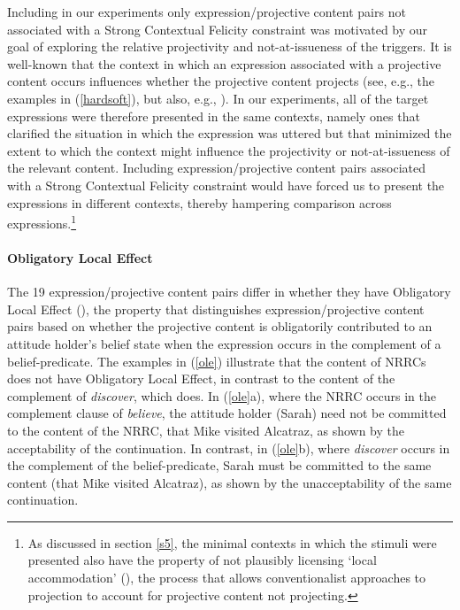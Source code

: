 \documentclass[11pt,fleqn]{article}
\newcommand{\6}{\mbox{$[\hspace*{-.6mm}[$}}
\newcommand{\9}{\mbox{$]\hspace*{-.6mm}]$}}
\begin{document}
Including in our experiments only expression/projective content pairs not associated with a Strong Contextual Felicity constraint was motivated by our goal of exploring the relative projectivity and not-at-issueness of the triggers. It is well-known that the context in which an expression associated with a projective content occurs influences whether the projective content projects (see, e.g., the examples in (\ref{hardsoft}), but also, e.g., \citealt{simons01,beaver-belly}). In our experiments, all of the target expressions were therefore presented in the same contexts, namely ones that clarified the situation in which the expression was uttered but that minimized the extent to which the context might influence the projectivity or not-at-issueness of the relevant content. Including expression/projective content pairs associated with a Strong Contextual Felicity constraint would have forced us to present the expressions in different contexts, thereby hampering comparison across expressions.\footnote{As discussed in section \ref{s5}, the minimal contexts in which the stimuli were presented also have the property of not plausibly licensing `local accommodation' (\citealt{heim83,vds92}), the process that allows conventionalist approaches to projection to account for projective content not projecting.} 

\paragraph{Obligatory Local Effect} The 19 expression/projective content pairs differ in whether they have Obligatory Local Effect (\citealt{brst-lang11}), the property that distinguishes expression/projective content pairs based on whether the projective content is obligatorily contributed to an attitude holder's belief state when the expression occurs in the complement of a belief-predicate. The examples in (\ref{ole}) illustrate that the content of NRRCs does not have Obligatory Local Effect, in contrast to the content of the complement of {\em discover}, which does. In (\ref{ole}a), where the NRRC occurs in the complement clause of {\em believe}, the attitude holder (Sarah) need not be committed to the content of the NRRC, that Mike visited Alcatraz, as shown by the acceptability of the continuation. In contrast, in (\ref{ole}b), where {\em discover} occurs in the complement of the belief-predicate, Sarah must be committed to the same content (that Mike visited Alcatraz), as shown by the unacceptability of the same continuation. 
\end{document}
